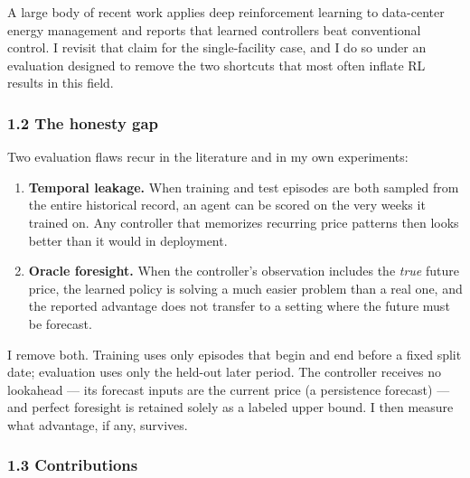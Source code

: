 \documentclass[
  11pt,
]{article}
\providecommand{\tightlist}{%
  \setlength{\itemsep}{0pt}\setlength{\parskip}{0pt}}
\begin{document}
A large body of recent work applies deep reinforcement learning to
data-center energy management and reports that learned controllers beat
conventional control. I revisit that claim for the single-facility case,
and I do so under an evaluation designed to remove the two shortcuts
that most often inflate RL results in this field.

\subsubsection{1.2 The honesty gap}\label{the-honesty-gap}

Two evaluation flaws recur in the literature and in my own experiments:

\begin{enumerate}
\def\labelenumi{\arabic{enumi}.}
\tightlist
\item
  \textbf{Temporal leakage.} When training and test episodes are both
  sampled from the entire historical record, an agent can be scored on
  the very weeks it trained on. Any controller that memorizes recurring
  price patterns then looks better than it would in deployment.
\item
  \textbf{Oracle foresight.} When the controller's observation includes
  the \emph{true} future price, the learned policy is solving a much
  easier problem than a real one, and the reported advantage does not
  transfer to a setting where the future must be forecast.
\end{enumerate}

I remove both. Training uses only episodes that begin and end before a
fixed split date; evaluation uses only the held-out later period. The
controller receives no lookahead --- its forecast inputs are the current
price (a persistence forecast) --- and perfect foresight is retained
solely as a labeled upper bound. I then measure what advantage, if any,
survives.

\subsubsection{1.3 Contributions}\label{contributions}
\end{document}
